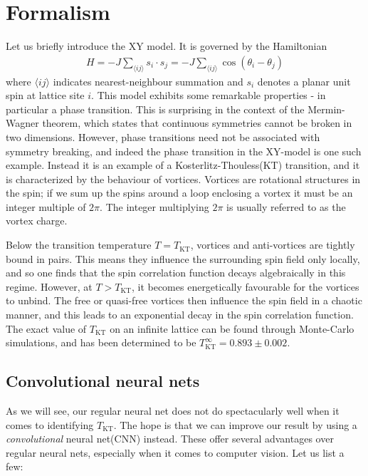 \documentclass[]{article}
\begin{document}
\section{Formalism}
Let us briefly introduce the XY model. It is governed by the Hamiltonian
\begin{align}
H = -J\sum_{\langle ij\rangle}s_i\cdot s_j = -J\sum_{\langle ij\rangle}\cos(\theta_i-\theta_j)
\end{align}
where $\langle ij \rangle$ indicates nearest-neighbour summation and $s_i$ denotes a planar unit spin at lattice site $i$. This model exhibits some remarkable properties - in particular a phase transition. This is surprising in the context of the Mermin-Wagner theorem\cite{PhysRevLett.17.1133}, which states that continuous symmetries cannot be broken in two dimensions. However, phase transitions need not be associated with symmetry breaking, and indeed the phase transition in the XY-model is one such example. Instead it is an example of a Kosterlitz-Thouless(KT) transition, and it is characterized by the behaviour of vortices. Vortices are rotational structures in the spin; if we sum up the spins around a loop enclosing a vortex it must be an integer multiple of $2\pi$. The integer multiplying $2\pi$ is usually referred to as the vortex charge.

Below the transition temperature $T = T_\text{KT}$, vortices and anti-vortices are tightly bound in pairs. This means they influence the surrounding spin field only locally, and so one finds that the spin correlation function decays algebraically in this regime. However, at $T > T_\text{KT}$, it becomes energetically favourable for the vortices to unbind. The free or quasi-free vortices then influence the spin field in a chaotic manner, and this leads to an exponential decay in the spin correlation function. The exact value of $T_\text{KT}$ on an infinite lattice can be found through Monte-Carlo simulations, and has been determined to be $T_\text{KT}^\infty = 0.893 \pm 0.002$.\cite{Olsson_1991}

\subsection{Convolutional neural nets}
As we will see, our regular neural net does not do spectacularly well when it comes to identifying $T_\text{KT}$. The hope is that we can improve our result by using a \textit{convolutional} neural net(CNN) instead. These offer several advantages over regular neural nets, especially when it comes to computer vision. Let us list a few:
\end{document}

